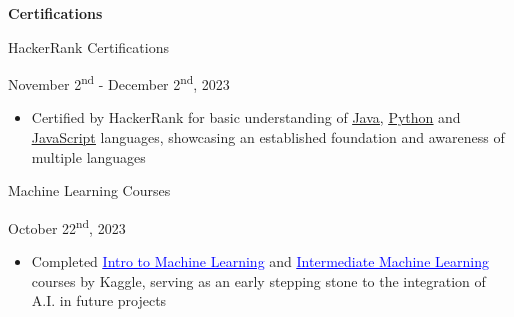 \documentclass[a4paper,11pt]{article}
\begin{document}
\begin{minipage}{.65\linewidth}
     \textbf{Certifications}
 \end{minipage}
  \begin{minipage}{.65\linewidth}
     HackerRank Certifications
 \end{minipage}
 \begin{minipage}{.34\linewidth}
    \raggedleft
    November 2\textsuperscript{nd} - December 2\textsuperscript{nd}, 2023
\end{minipage}

 \begin{minipage}{\linewidth}
 \vspace{10pt}
\begin{itemize}
    \item Certified by HackerRank for basic understanding of \href{https://www.hackerrank.com/certificates/fbcafb873c96}{\uline{Java}}, \href{https://www.hackerrank.com/certificates/4a8e6ae17626}{\uline{Python}} and \href{https://www.hackerrank.com/certificates/b4b9cb2f4e4a}{\uline{JavaScript}} languages, showcasing an established foundation and awareness of multiple languages
\end{itemize}

 \vspace{1pt}
 \end{minipage}

  \begin{minipage}{.65\linewidth}
     Machine Learning Courses 
 \end{minipage}
 \begin{minipage}{.34\linewidth}
     \flushright
     October 22\textsuperscript{nd}, 2023
 \end{minipage}
 \begin{minipage}{\linewidth}
 \vspace{10pt}
 \begin{itemize}
     \item Completed \href{https://www.kaggle.com/learn/certification/jeremyfriesen123/intro-to-machine-learning}{\textcolor{blue}{\uline{Intro to Machine Learning}}} and \href{https://www.kaggle.com/learn/certification/jeremyfriesen123/intermediate-machine-learning}{\textcolor{blue}{\uline{Intermediate Machine Learning}}} courses by Kaggle, serving as an early stepping stone to the integration of A.I. in future projects
 \end{itemize}
 \vspace{1pt}
 \end{minipage}
\end{document}

